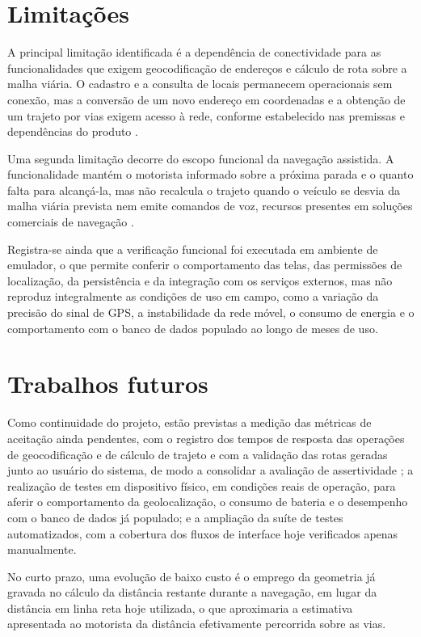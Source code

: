 \section{Limitações}

A principal limitação identificada é a dependência de conectividade para as funcionalidades que exigem geocodificação de endereços e cálculo de rota sobre a malha viária. O cadastro e a consulta de locais permanecem operacionais sem conexão, mas a conversão de um novo endereço em coordenadas e a obtenção de um trajeto por vias exigem acesso à rede, conforme estabelecido nas premissas e dependências do produto \cite{sriVisao2025}.

Uma segunda limitação decorre do escopo funcional da navegação assistida. A funcionalidade mantém o motorista informado sobre a próxima parada e o quanto falta para alcançá-la, mas não recalcula o trajeto quando o veículo se desvia da malha viária prevista nem emite comandos de voz, recursos presentes em soluções comerciais de navegação \cite{sriEspecComp2025}.

Registra-se ainda que a verificação funcional foi executada em ambiente de emulador, o que permite conferir o comportamento das telas, das permissões de localização, da persistência e da integração com os serviços externos, mas não reproduz integralmente as condições de uso em campo, como a variação da precisão do sinal de GPS, a instabilidade da rede móvel, o consumo de energia e o comportamento com o banco de dados populado ao longo de meses de uso.

\section{Trabalhos futuros}

Como continuidade do projeto, estão previstas a medição das métricas de aceitação ainda pendentes, com o registro dos tempos de resposta das operações de geocodificação e de cálculo de trajeto e com a validação das rotas geradas junto ao usuário do sistema, de modo a consolidar a avaliação de assertividade \cite{sriPedido2025}; a realização de testes em dispositivo físico, em condições reais de operação, para aferir o comportamento da geolocalização, o consumo de bateria e o desempenho com o banco de dados já populado; e a ampliação da suíte de testes automatizados, com a cobertura dos fluxos de interface hoje verificados apenas manualmente.

No curto prazo, uma evolução de baixo custo é o emprego da geometria já gravada no cálculo da distância restante durante a navegação, em lugar da distância em linha reta hoje utilizada, o que aproximaria a estimativa apresentada ao motorista da distância efetivamente percorrida sobre as vias.

